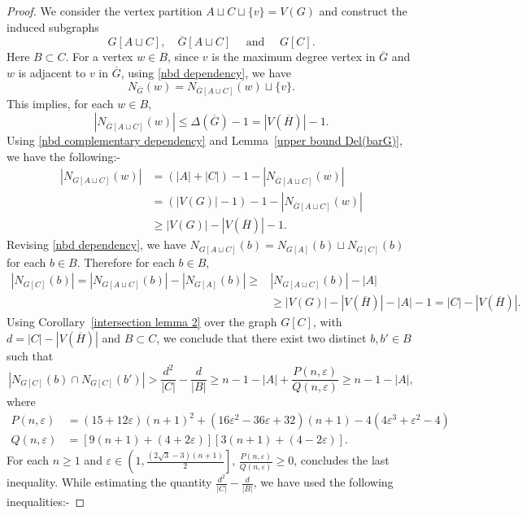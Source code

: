 \documentclass[10pt,a4paper]{amsart}
\begin{document}
\begin{proof}
We  consider the vertex partition $A\sqcup C\sqcup\{v\}=V(G)$ and construct the induced subgraphs 
\begin{equation*}
 G[A\sqcup C],\quad\overline{G}[A\sqcup C]\quad\text{ and }\quad G[C].   
\end{equation*}
Here $B\subset C$.  For a vertex $w\in B$, since $v$ is the maximum degree vertex in $\overline{G}$ and $w$ is adjacent to $v$ in $\overline{G}$, using \eqref{nbd dependency}, we have 
\begin{equation*}
 N_{\overline{G}}(w)=N_{\overline{G}[A\sqcup C]}(w)\sqcup\{v\}.   
\end{equation*}
This implies, for each $w\in B$,
\begin{equation*}
|N_{\overline{G}[A\sqcup C]}(w)|\leq\Delta(\overline{G})-1=|V(\overline{H})|-1.
\end{equation*}
Using \eqref{nbd complementary dependency} and Lemma~\ref{upper bound Del(barG)}, we have the following:- 
\begin{align*}
|N_{G[A\sqcup C]}(w)|&=(|A|+|C|)-1-|N_{\overline{G}[A\sqcup C]}(w)|\\
&=(|V(G)|-1)-1-|N_{\overline{G}[A\sqcup C]}(w)|\\
&\geq |V(G)|-|V(\overline{H})|-1.
\end{align*}
Revising \eqref{nbd dependency}, we have $N_{G[A\sqcup C]}(b)=N_{G[A]}(b)\sqcup N_{G[C]}(b)$ for each $b\in B$. Therefore for each $b\in B$,
\begin{align*}
|N_{G[C]}(b)|=|N_{G[A\sqcup C]}(b)|-|N_{G[A]}(b)|\geq &|N_{G[A\sqcup C]}(b)|-|A|\\
&\geq |V(G)|-|V(\overline{H})|-|A|-1=|C|-|V(\overline{H})|.   
\end{align*}
Using Corollary~\ref{intersection lemma 2} over the graph $G[C]$, with $d=|C|-|V(\overline{H})|$ and $B\subset C$,  we conclude that there exist two distinct $b,b'\in B$ such that
\begin{equation*}
|N_{G[C]}(b)\cap N_{G[C]}(b')|>\frac{d^{2}}{|C|}-\frac{d}{|B|}\geq n-1-|A|+\frac{P(n,\varepsilon)}{Q(n,\varepsilon)}\geq n-1-|A|,    
\end{equation*}
where 
\begin{align*}
P(n,\varepsilon)&=(15+12\varepsilon)(n+1)^{2}+(16\varepsilon^{2}-36\varepsilon+32)(n+1)-4(4\varepsilon^{3}+\varepsilon^{2}-4)\\
Q(n,\varepsilon)&=[9(n+1)+(4+2\varepsilon)][3(n+1)+(4-2\varepsilon)]. 
\end{align*}
For each $n\geq 1$ and $\varepsilon\in\left(1,\frac{(2\sqrt{3}-3)(n+1)}{2}\right]$, $\frac{P(n,\varepsilon)}{Q(n,\varepsilon)}\geq0$, concludes the last inequality. While estimating the quantity $\frac{d^{2}}{|C|}-\frac{d}{|B|}$, we have used the following inequalities:- 

\end{proof}
\end{document}
